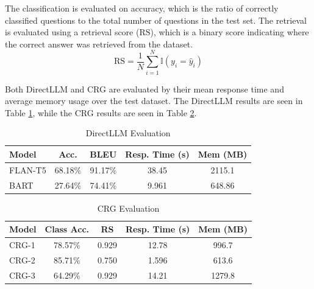\documentclass[conference]{IEEEtran}
\begin{document}
The classification is evaluated on accuracy, which is the ratio of correctly classified questions to the total number of questions in the test set.
The retrieval is evaluated using a retrieval score ($\text{RS}$), which is a binary score indicating where the correct answer was retrieved from the dataset. 
\begin{equation}
    \text{RS} = \frac{1}{N} \sum_{i=1}^{N} \mathbb{I}(y_i = \hat{y}_i)
\end{equation}

Both DirectLLM and CRG are evaluated by their mean response time and average memory usage over the test dataset.
The DirectLLM results are seen in Table \ref{tab:directllm_results}, while the CRG results are seen in Table \ref{tab:crg_results}.

\begin{table}[!ht]
    \centering
    \caption{DirectLLM Evaluation}
    \label{tab:directllm_results}
    \begin{tabular}{l|c|c|c|c}
        \toprule
        \textbf{Model} & \textbf{Acc.} & \textbf{BLEU} & \textbf{Resp. Time (s)} & \textbf{Mem (MB)} \\
        \midrule
        FLAN-T5        & 68.18\%                & 91.17\%                   & 38.45 &  2115.1                         \\
        BART           & 27.64\%                & 74.41\%                   & 9.961 &  648.86                         \\
        \bottomrule
    \end{tabular}
\end{table}

\begin{table}[!ht]
    \centering
    \caption{CRG Evaluation}
    \label{tab:crg_results}
    \begin{tabular}{l|c|c|c|c}
        \toprule
        \textbf{Model} & \textbf{Class Acc.} & \textbf{RS} & \textbf{Resp. Time (s)} & \textbf{Mem (MB)} \\
        \midrule
        CRG-1 & 78.57\% & 0.929 & 12.78 & 996.7 \\
        CRG-2 & 85.71\% & 0.750 & 1.596 & 613.6 \\
        CRG-3 & 64.29\% & 0.929 & 14.21 & 1279.8\\
        \bottomrule
    \end{tabular}
\end{table}

\end{document}
